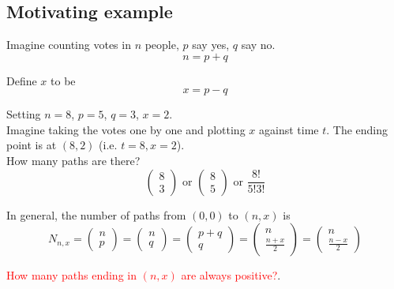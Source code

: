 \chapter{}

\section{Motivating example}

Imagine counting votes in $n$ people, $p$ say yes, $q$ say no. \\
\[
  n = p + q
\] 

Define $x$ to be 
\[
  x = p - q
\] 

Setting $n = 8$, $p = 5$,  $q = 3$,  $x = 2$.  \\

Imagine taking the votes one by one and plotting  $x$ against time $t$. The ending point is at $(8, 2)$ (i.e.  $t = 8, x = 2$). \\

How many paths are there? \\
\[
   \begin{pmatrix} 8 \\ 3 \end{pmatrix} \text{ or } \begin{pmatrix} 8 \\ 5 \end{pmatrix}  \text{ or }  \frac{8!}{5!3!}
\] 

In general, the number of paths from $(0, 0)$ to $(n, x)$ is 
\[
N_{n, x} = \begin{pmatrix} n \\ p \end{pmatrix}  = \begin{pmatrix}  n \\ q \end{pmatrix}  = \begin{pmatrix}  p + q \\ q \end{pmatrix}  = \begin{pmatrix} n \\ \frac{n + x}{2} \end{pmatrix} = \begin{pmatrix}  n \\ \frac{ n - x}{ 2} \end{pmatrix}  
\] 

\textcolor{red}{How many paths ending in $(n, x)$ are always positive?}. \\


